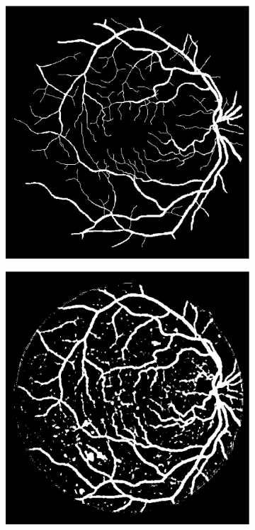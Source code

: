 \documentclass[aps,prb,10pt,twocolumn,groupedaddress]{revtex4-1}
\begin{document}
\begin{figure}[!t]
\begin{subfigure}[]{0.22\textwidth}
		\includegraphics[width=\textwidth]{images/14_manual1.eps}
		\caption{}
	\end{subfigure}
	\hspace{0.25cm}
	\centering
	\begin{subfigure}[]{0.22\textwidth}
		\centering
		\includegraphics[width=\textwidth]{images/14_test_nn_lowest_accuracy_89.eps}

\end{subfigure}
\end{figure}
\end{document}
